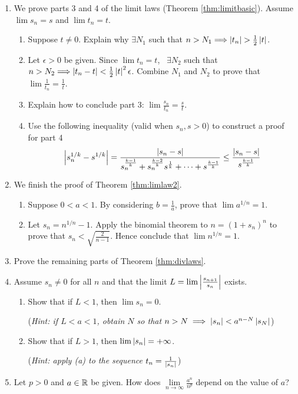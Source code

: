 \begin{exercises}{}{}
\begin{enumerate}
	
		\item\label{exs:limitlawsfinish} We prove parts 3 and 4 of the limit laws (Theorem \ref{thm:limitbasic}). Assume $\lim s_n= s$ and $\lim t_n=t$.
		\begin{enumerate}
		  \item Suppose $t\neq 0$. Explain why $\exists N_1$ such that $n>N_1\Longrightarrow \nm{t_n}>\frac 12\nm t$.
		  \item Let $\epsilon>0$ be given. Since $\lim t_n=t$, \ $\exists N_2$ such that $n>N_2\Longrightarrow \left| t_n-t\right|<\frac 12\left| t\right|^2\epsilon$. Combine $N_1$ and $N_2$ to prove that $\lim\frac 1{t_n}=\frac 1t$.
		  \item Explain how to conclude part 3: $\lim\frac{s_n}{t_n}=\frac st$.
		  \item Use the following inequality (valid when $s_n,s>0$) to construct a proof for part 4
			\[
				\left| s_n^{1/k}-s^{1/k}\right|
				=\frac{\left| s_n-s\right|}{{s_n^{\frac{k-1}k}+s_n^{\frac{k-2}k}s^{\frac 1k}+\cdots +s^{\frac{k-1}k}}}
				\le \frac{\left| s_n-s\right|}{s^{\frac{k-1}k}}
			\]
	 	\end{enumerate}
	
	
		\item\label{exs:nrootlimit}
		We finish the proof of Theorem \ref{thm:limlaw2}.
		\begin{enumerate}
			\item Suppose $0<a<1$. By considering $b=\frac 1a$, prove that $\lim a^{1/n}=1$.
			\item Let $s_n=n^{1/n}-1$. Apply the binomial theorem to $n=(1+s_n)^n$ to prove that $s_n<\sqrt{\frac 2{n-1}}$.
			Hence conclude that $\lim n^{1/n}=1$.
		\end{enumerate}
			
			
		\item Prove the remaining parts of Theorem \ref{thm:divlaws}.
			
			
		\item%
	  Assume $s_n\neq 0$ for all $n$ and that the limit $L=\lim\smash[b]{\left| \frac{s_{n+1}}{s_n}\right|}$ exists.
	  \begin{enumerate}
		  \item Show that if $L<1$, then $\lim s_n=0$.\par
		  (\emph{Hint: if $L<a<1$, obtain $N$ so that $n>N\implies\left| s_n\right|<a^{n-N}\left| s_N\right|$})
		  \item Show that if $L>1$, then $\lim\left| s_n\right|=+\infty$.\par
		  (\emph{Hint: apply (a) to the sequence $t_n=\frac 1{\left| s_n\right|}$})
	  \end{enumerate}
	  
		\item%
		Let $p>0$ and $a\in\mathbb{R}$ be given. How does $\lim\limits_{n\to\infty}\frac{a^n}{n^p}$ depend on the value of $a$?

	\end{enumerate}
\end{exercises}


